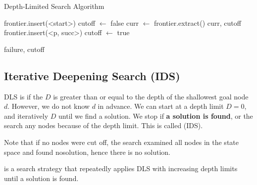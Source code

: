 \begin{algorithm}[ht!]
    \caption{Depth-Limited Search Algorithm}
    \begin{algorithmic}[1]
            \State frontier.insert(<start>)
            \State cutoff $\gets$ false
                \State curr $\gets$ frontier.extract()
                    \State \Return curr, cutoff 
                        \State frontier.insert(<p, succ>)
                    \EndFor
                \Else
                    \State cutoff $\gets$ true
                \EndIf
            \EndWhile

            \State \Return failure, cutoff
        \EndFunction
    \end{algorithmic}
\end{algorithm}

\subsection{Iterative Deepening Search (IDS)}

DLS is  if the  $D$ is greater than or equal to the depth of the shallowest goal node $d$. However, we do not know $d$ in advance. We can start at a depth limit $D = 0$, and iteratively  $D$ until we find a solution. We stop if {\color{darkGreen}\textbf{a solution is found}}, or the search  any nodes because of the depth limit. This is called  (IDS).

Note that if no nodes were cut off, the search examined all nodes in the state space and found nosolution, hence there is no solution. 

\begin{definition}\label{def:ids}
     is a search strategy that repeatedly applies DLS with increasing depth limits until a solution is found.
\end{definition}

